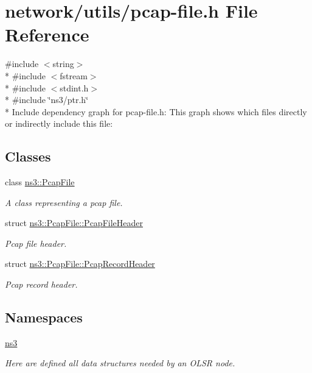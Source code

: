 \hypertarget{pcap-file_8h}{}\section{network/utils/pcap-\/file.h File Reference}
\label{pcap-file_8h}
{\ttfamily \#include $<$string$>$}\\*
{\ttfamily \#include $<$fstream$>$}\\*
{\ttfamily \#include $<$stdint.\+h$>$}\\*
{\ttfamily \#include \char`\"{}ns3/ptr.\+h\char`\"{}}\\*
Include dependency graph for pcap-\/file.h\+:
This graph shows which files directly or indirectly include this file\+:
\subsection*{Classes}
\begin{DoxyCompactItemize}
\item 
class \hyperlink{classns3_1_1PcapFile}{ns3\+::\+Pcap\+File}
\begin{DoxyCompactList}\small\item\em A class representing a pcap file. \end{DoxyCompactList}\item 
struct \hyperlink{structns3_1_1PcapFile_1_1PcapFileHeader}{ns3\+::\+Pcap\+File\+::\+Pcap\+File\+Header}
\begin{DoxyCompactList}\small\item\em Pcap file header. \end{DoxyCompactList}\item 
struct \hyperlink{structns3_1_1PcapFile_1_1PcapRecordHeader}{ns3\+::\+Pcap\+File\+::\+Pcap\+Record\+Header}
\begin{DoxyCompactList}\small\item\em Pcap record header. \end{DoxyCompactList}\end{DoxyCompactItemize}
\subsection*{Namespaces}
\begin{DoxyCompactItemize}
\item 
 \hyperlink{namespacens3}{ns3}
\begin{DoxyCompactList}\small\item\em Here are defined all data structures needed by an O\+L\+SR node. \end{DoxyCompactList}\end{DoxyCompactItemize}
